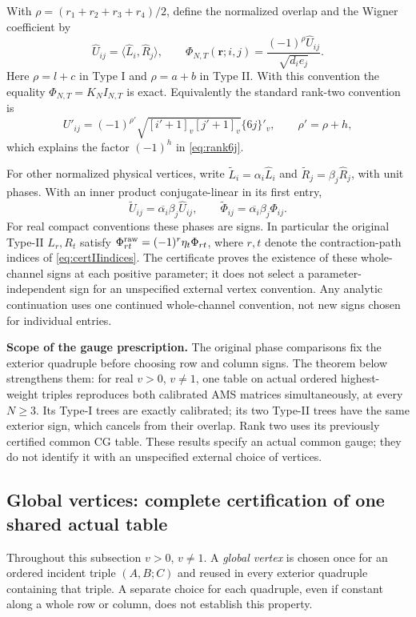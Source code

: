 \documentclass[10pt,a4paper]{article}
\newenvironment{revision}{\begingroup}{\endgroup}
\begin{document}
\begin{revision}
With $\rho=(r_1+r_2+r_3+r_4)/2$, define the normalized overlap and the
Wigner coefficient by
\begin{equation}\label{eq:certWignerphase}
 \widehat U_{ij}=\langle\widehat L_i,\widehat R_j\rangle,
 \qquad
 \Phi_{N,T}(\boldsymbol r;i,j)
 =\frac{(-1)^\rho\widehat U_{ij}}{\sqrt{d_i e_j}}.
\end{equation}
Here $\rho=l+c$ in Type I and $\rho=a+b$ in Type II.
With this convention the equality $\Phi_{N,T}=K_NI_{N,T}$ is exact.
Equivalently the standard rank-two convention is
\[
 U'_{ij}=(-1)^{\rho'}\sqrt{[i'+1]_v[j'+1]_v}\{6j\}'_v,
 \qquad\rho'=\rho+h,
\]
which explains the factor $(-1)^h$ in \eqref{eq:rank6j}.

For other normalized physical vertices, write
$\widetilde L_i=\alpha_i\widehat L_i$ and
$\widetilde R_j=\beta_j\widehat R_j$, with unit phases.
With an inner product conjugate-linear in its first entry,
\[
 \widetilde U_{ij}=\overline{\alpha_i}\beta_j\widehat U_{ij},
 \qquad\widetilde\Phi_{ij}=\overline{\alpha_i}\beta_j\Phi_{ij}.
\]
For real compact conventions these phases are signs. In particular the
original Type-II $L_r,R_t$ satisfy
$\Phi^{\rm raw}_{rt}=(-1)^r\eta_t\Phi_{rt}$, where $r,t$ denote
the contraction-path indices of \eqref{eq:certIIindices}.
The certificate proves the existence of these whole-channel signs at
each positive parameter; it does not select a parameter-independent sign
for an unspecified external vertex convention. Any analytic continuation
uses one continued whole-channel convention, not new signs chosen for
individual entries.

\noindent\textbf{Scope of the gauge prescription.}
The original phase comparisons fix the exterior quadruple before choosing
row and column signs. The theorem below strengthens them: for real
$v>0$, $v\ne1$, one table on actual ordered highest-weight triples
reproduces both calibrated AMS matrices simultaneously, at every
$N\ge3$. Its Type-I trees are exactly calibrated; its two Type-II
trees have the same exterior sign, which cancels from their overlap.
Rank two uses its previously certified common CG table. These results
specify an actual common gauge; they do not identify it with an unspecified
external choice of vertices.

\subsection{Global vertices: complete certification of one shared actual table}
\label{sec:globalvertices}
Throughout this subsection $v>0$, $v\ne1$. A \emph{global vertex}
is chosen once for an ordered incident triple $(A,B;C)$ and reused in
every exterior quadruple containing that triple. A separate choice for
each quadruple, even if constant along a whole row or column, does not
establish this property.


\end{revision}
\end{document}
